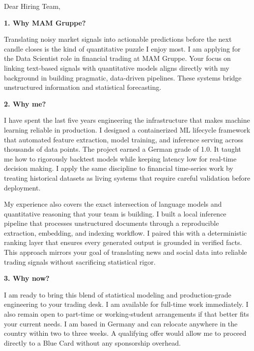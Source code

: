 \documentclass[11pt,a4paper]{coverletter}
\begin{document}

\opening{Dear Hiring Team,}

\vspace{8pt}\noindent\textbf{1. Why MAM Gruppe?}\par\vspace{3pt}

Translating noisy market signals into actionable predictions before the next candle closes is the kind of quantitative puzzle I enjoy most. I am applying for the Data Scientist role in financial trading at MAM Gruppe. Your focus on linking text-based signals with quantitative models aligns directly with my background in building pragmatic, data-driven pipelines. These systems bridge unstructured information and statistical forecasting.

\vspace{8pt}\noindent\textbf{2. Why me?}\par\vspace{3pt}

I have spent the last five years engineering the infrastructure that makes machine learning reliable in production. I designed a containerized ML lifecycle framework that automated feature extraction, model training, and inference serving across thousands of data points. The project earned a German grade of 1.0. It taught me how to rigorously backtest models while keeping latency low for real-time decision making. I apply the same discipline to financial time-series work by treating historical datasets as living systems that require careful validation before deployment.

My experience also covers the exact intersection of language models and quantitative reasoning that your team is building. I built a local inference pipeline that processes unstructured documents through a reproducible extraction, embedding, and indexing workflow. I paired this with a deterministic ranking layer that ensures every generated output is grounded in verified facts. This approach mirrors your goal of translating news and social data into reliable trading signals without sacrificing statistical rigor.

\vspace{8pt}\noindent\textbf{3. Why now?}\par\vspace{3pt}

I am ready to bring this blend of statistical modeling and production-grade engineering to your trading desk. I am available for full-time work immediately. I also remain open to part-time or working-student arrangements if that better fits your current needs. I am based in Germany and can relocate anywhere in the country within two to three weeks. A qualifying offer would allow me to proceed directly to a Blue Card without any sponsorship overhead.
\end{document}
